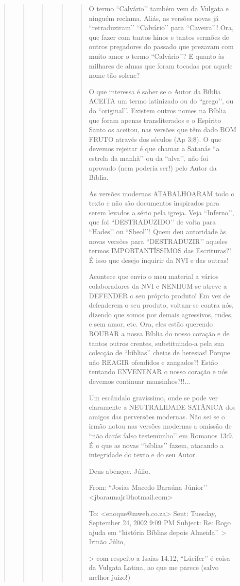 \begin{quote}
\begin{quote}
\begin{quote}
\begin{quote}
\begin{quote}
O termo ``Calvário’’ também vem da Vulgata e ninguém reclama. Aliás, as
versões novas já ``retraduziram’’ ``Calvário’’ para ``Caveira’’! Ora, que
fazer com tantos hinos e tantos sermões de outros pregadores do
passado que prezavam com muito amor o termo ``Calvário’’? E quanto às
milhares de almas que foram tocadas por aquele nome tão solene?

O que interessa é saber se o Autor da Bíblia ACEITA um termo
latinizado ou do ``grego’’, ou do ``original’’. Existem outros nomes na
Bíblia que foram apenas transliterados e o Espírito Santo os aceitou,
nas versões que têm dado BOM FRUTO através dos séculos (Ap 3:8). O
que devemos rejeitar é que chamar a Satanás ``a estrela da manhã’’ ou da
``alva’’, não foi aprovado (nem poderia ser!) pelo Autor da Bíblia.

As versões modernas ATABALHOARAM todo o texto e não são documentos
inspirados para serem levados a sério pela igreja. Veja ``Inferno’’, que
foi ``DESTRADUZIDO’’ de volta para ``Hades’’ ou ``Sheol’’! Quem deu
autoridade às novas versões para ``DESTRADUZIR’’ aqueles termos
IMPORTANTÍSSIMOS das Escrituras?! É isso que desejo inquirir da NVI e
das outras!

Acontece que envio o meu material a vários colaboradores da NVI e
NENHUM se atreve a DEFENDER o seu próprio produto! Em vez de
defenderem o seu produto, voltam-se contra nós, dizendo que somos por
demais agressivos, rudes, e sem amor, etc. Ora, eles estão querendo
ROUBAR a nossa Bíblia do nosso coração e de tantos outros crentes,
substituindo-a pela sua colecção de ``bíblias’’ cheias de heresias!
Porque não REAGIR ofendidos e zangados?! Estão tentando ENVENENAR o
nosso coração e nós devemos continuar mansinhos?!!...

Um escândalo gravíssimo, onde se pode ver claramente a NEUTRALIDADE
SATÂNICA dos amigos das perversões modernas. Não sei se o irmão notou
nas versões modernas a omissão de ``não darás falso testemunho’’ em
Romanos 13:9. É o que as novas ``bíblias’’ fazem, atacando a
integridade do texto e do seu Autor.

Deus abençoe. Júlio. 


From: ``Josias Macedo Baraúna Júnior’’ <jbaraunajr@hotmail.com>

To: <enoque@mweb.co.za>
Sent: Tuesday, September 24, 2002 9:09 PM
Subject: Re: Rogo ajuda em ``história Bíblias depois Almeida’’
> Irmão Júlio,

> com respeito a Isaías 14.12, ``Lúcifer’’ é coisa da Vulgata Latina, ao que me parece (salvo melhor juízo!)


\end{quote}
\end{quote}
\end{quote}
\end{quote}
\end{quote}
